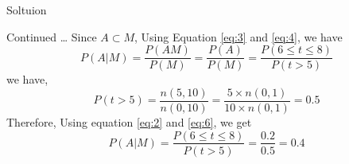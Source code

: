 \documentclass{beamer}
\begin{document}
\begin{frame}{Soltuion}
    \begin{block}{Continued \ldots}
        Since $A \subset M$, Using Equation \eqref{eq:3} and \eqref{eq:4}, we have
        \begin{equation}
            P(A|M) = \frac{P(AM)}{P(M)} = \frac{P(A)}{P(M)} = \frac{P(6 \leq t \leq 8)}{P(t > 5)} 
        \end{equation}
        we have,
        \begin{equation}
            P(t > 5) = \frac{n(5,10)}{n(0,10)} = \frac{5 \times n(0,1)}{10 \times n(0,1)} = 0.5 \label{eq:6}
        \end{equation}
        Therefore, Using equation \eqref{eq:2} and \eqref{eq:6}, we get
        \begin{equation}
            P(A|M) = \frac{P(6 \leq t \leq 8)}{P(t > 5)} = \frac{0.2}{0.5} = 0.4
        \end{equation}
    \end{block}
    
\end{frame}
\end{document}
